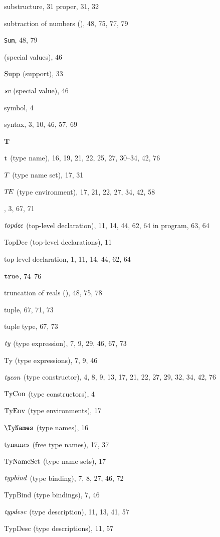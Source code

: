 \begin{theindex}
\item substructure, 31
\subitem proper, 31, 32
\item subtraction of numbers (\ml{-}), 48, 75, 77, 79
\item {\tt Sum}, 48, 79
\item {\SVal} (special values), 46
\item $\mathop{\rm Supp}\nolimits$ (support), 33
\item $\mbox{\it sv}$ (special value), 46
\item symbol, 4
\item syntax, 3, 10, 46, 57, 69
\indexspace
\parbox{65mm}{\hfil{\large\bf T}\hfil}
\indexspace
\item ${\rm t}^{{}}$ (type name), 16, 19, 21, 22, 25, 27, 30--34, 42, 76
\item $T$ (type name set), 17, 31
\item $\mbox{$T\!E$}$ (type environment), 17, 21, 22, 27, 34, 42, 58
\item \THEN, 3, 67, 71
\item ${\it topdec}$ (top-level declaration), 11, 14, 44, 62, 64
\subitem in program, 63, 64
\item TopDec (top-level declarations), 11
\item top-level declaration, 1, 11, 14, 44, 62, 64
\item $\mbox{\tt true}$, 74--76
\item truncation of reals (), 48, 75, 78
\item tuple, 67, 71, 73
\item tuple type, 67, 73
\item ${\it ty}$ (type expression), 7, 9, 29, 46, 67, 73
\item Ty (type expressions), 7, 9, 46
\item ${\it tycon}$ (type constructor), 4, 8, 9, 13, 17, 21, 22, 27, 29, 32, 34, 42, 76
\item ${\rm TyCon}$ (type constructors), 4
\item ${\rm TyEnv}$ (type environments), 17
\item $\TyNames$ (type names), 16
\item $\mathop{\rm tynames}\nolimits$ (free type names), 17, 37
\item ${\rm TyNameSet}$ (type name sets), 17
\item ${\it typbind}$ (type binding), 7, 8, 27, 46, 72
\item TypBind (type bindings), 7, 46
\item ${\it typdesc}$ (type description), 11, 13, 41, 57
\item TypDesc (type descriptions), 11, 57

\end{theindex}
